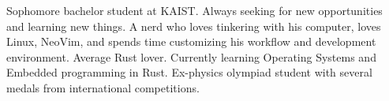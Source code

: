 

\begin{cvparagraph}

Sophomore bachelor student at KAIST. Always seeking for new opportunities and learning new things. A nerd who loves tinkering with his computer, loves Linux, NeoVim, and spends time customizing his workflow and development environment. Average Rust lover. Currently learning Operating Systems and Embedded programming in Rust. Ex-physics olympiad student with several medals from international competitions.
\end{cvparagraph}
